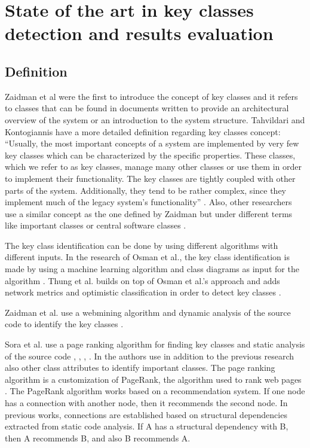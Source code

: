 \documentclass[12pt, a4paper, twoside]{report}
\begin{document}
\chapter{State of the art in key classes detection and results evaluation}
\label{cap:state_of_art}

\section{Definition}
\label{sec:definition}
Zaidman et al \cite{ZaidmanJurnal} were the first to introduce the concept of key classes and it refers to classes that can be found in documents written to provide an architectural overview of the system or an introduction to the system structure. 
Tahvildari and Kontogiannis have a more detailed definition regarding key classes concept: “Usually, the most important concepts of a system are implemented by very few key classes which can be characterized by the specific properties. These classes, which we refer to as key classes, manage many other classes or use them in order to implement their functionality. The key classes are tightly coupled with other parts of the system. Additionally, they tend to be rather complex, since they implement much of the legacy system’s functionality” \cite{Tahvildari2004ImprovingDQ}.
Also, other researchers use a similar concept as the one defined by Zaidman but under different terms like important classes  \cite{Meyer2014IdentifyingIC} or central software classes \cite{CentralClassesSteidl}.


The key class identification can be done by using different algorithms with different inputs. In the research of Osman et al., the key class identification is made by using a machine learning algorithm and class diagrams as input for the algorithm \cite{6676885}. Thung et al. builds on top of Osman et al.’s approach and adds network metrics and optimistic classification in order to detect key classes \cite{rocclasification}.  

Zaidman et al. use a webmining algorithm and dynamic analysis of the source code to identify the key classes \cite{ZaidmanJurnal}.

Sora et al. use a page ranking algorithm for finding key classes and static analysis of the source code \cite{PagerankENASE}, \cite{enase15}, \cite{SoraSpringer}, \cite{PagerankSACI}. In \cite{Finding-key-classes} the authors use in addition to the previous research also other class attributes to identify important classes.
The page ranking algorithm is a customization of PageRank, the algorithm used to rank web pages \cite{ilprints422}.
The PageRank algorithm works based on a recommendation system. If one node has a connection with another node, then it recommends the second node. In previous works, connections are established based on structural dependencies extracted from static code analysis. If A has a structural dependency with B, then A recommends B, and also B recommends A.
\end{document}

